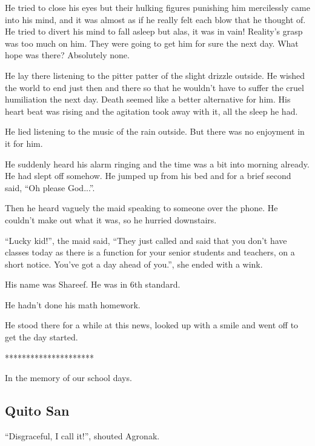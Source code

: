 \documentclass[twoside,11pt,titlepage]{article}
\begin{document}
He tried to close his eyes but their hulking figures punishing him mercilessly came into his mind, and it was almost as if he really felt each blow that he thought of. He tried to divert his mind to fall asleep but alas, it was in vain! Reality's grasp was too much on him. They were going to get him for sure the next day. What hope was there? Absolutely none.

He lay there listening to the pitter patter of the slight drizzle outside. He wished the world to end just then and there so that he wouldn't have to suffer the cruel humiliation the next day. Death seemed like a better alternative for him. His heart beat was rising and the agitation took away with it, all the sleep he had.

He lied listening to the music of the rain outside. But there was no enjoyment in it for him.

He suddenly heard his alarm ringing and the time was a bit into morning already. He had slept off somehow. He jumped up from his bed and for a brief second said, ``Oh please God...''.

Then he heard vaguely the maid speaking to someone over the phone. He couldn't make out what it was, so he hurried downstairs.

``Lucky kid!'', the maid said, ``They just called and said that you don't have classes today as there is a function for your senior students and teachers, on a short notice. You've got a day ahead of you.'', she ended with a wink.

His name was Shareef. He was in 6th standard.

He hadn't done his math homework.

He stood there for a while at this news, looked up with a smile and went off to get the day started.

\bigskip
\begin{center}
*********************
\end{center}

In the memory of our school days.

\newpage

\begin{center}
  \section{Quito San}
\end{center}
\bigskip
\bigskip
\bigskip

``Disgraceful, I call it!'', shouted Agronak.
\end{document}
